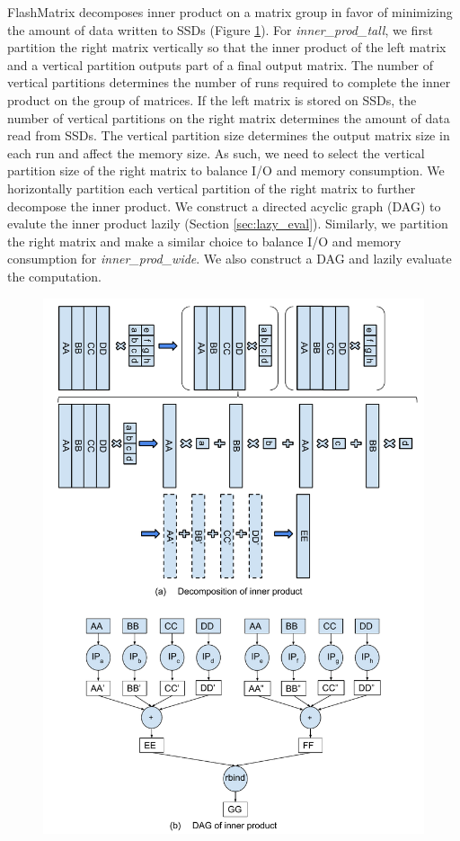 FlashMatrix decomposes inner product on a matrix group in favor of minimizing
the amount of data written to SSDs (Figure \ref{fig:inner_prod}).
For \textit{inner\_prod\_tall}, we first partition the right matrix vertically
so that the inner product of the left matrix and a vertical partition outputs
part of a final output matrix. The number of vertical partitions determines
the number of runs required to complete the inner product on the group of matrices.
If the left matrix is stored on SSDs, the number of vertical partitions on
the right matrix determines the amount of data read from SSDs. The vertical
partition size determines the output matrix size in each run and affect
the memory size. As such, we need to select the vertical partition size of
the right matrix to balance I/O and memory consumption. We horizontally partition
each vertical partition of the right matrix to further decompose the inner
product. We construct a directed acyclic graph (DAG) to evalute the inner
product lazily (Section \ref{sec:lazy_eval}). Similarly, we partition the right
matrix and make a similar choice to balance I/O and memory consumption for
\textit{inner\_prod\_wide}. We also construct a DAG and lazily evaluate
the computation.

\begin{figure}
\centering
\includegraphics[scale=0.4]{./inner_prod_tall.pdf}
\vspace{-5pt}
\caption{}
\vspace{-5pt}
\label{fig:inner_prod}
\end{figure}


